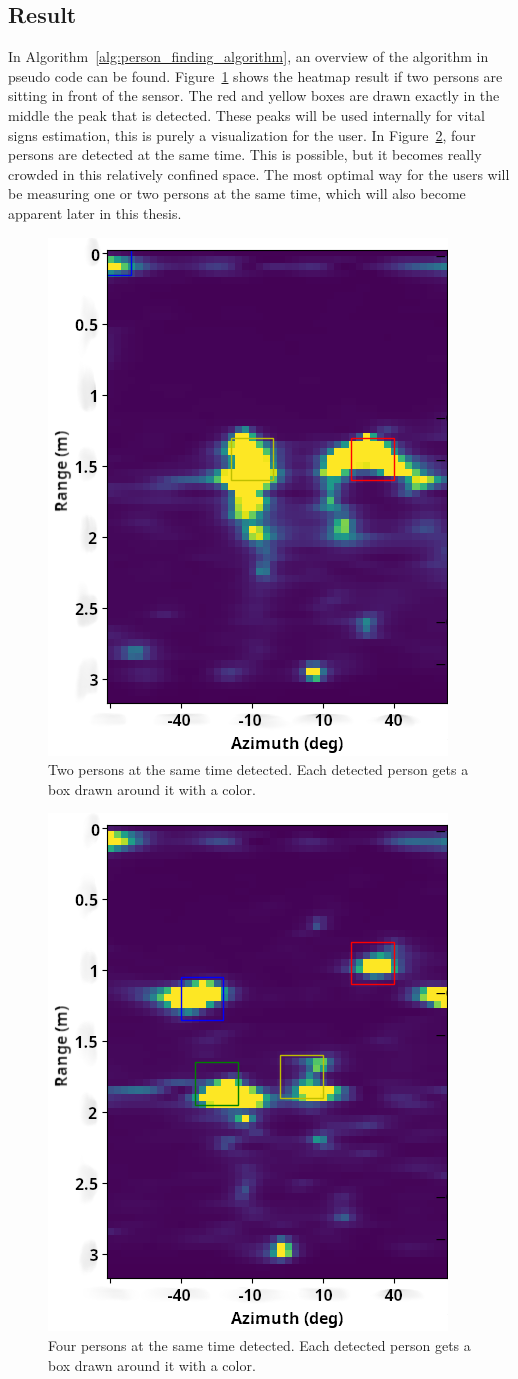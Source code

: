 \subsection{Result}
In Algorithm~\ref{alg:person_finding_algorithm}, an overview of the algorithm in pseudo code can be found. Figure~\ref{fig:person_detection_two} shows the heatmap result if two persons are sitting in front of the sensor. The red and yellow boxes are drawn exactly in the middle the peak that is detected. These peaks will be used internally for vital signs estimation, this is purely a visualization for the user. In Figure~\ref{fig:person_detection_four}, four persons are detected at the same time. This is possible, but it becomes really crowded in this relatively confined space. The most optimal way for the users will be measuring one or two persons at the same time, which will also become apparent later in this thesis. 


\begin{figure}[t]
\centering
\includegraphics[width=.5\textwidth]{figures/people_detection/multiple_3_crop_axes.png}
\caption{Two persons at the same time detected. Each detected person gets a box drawn around it with a color.}
\label{fig:person_detection_two}
\end{figure}

\begin{figure}[t]
\centering
\includegraphics[width=.5\textwidth]{figures/people_detection/4_2_crop_axis.png}
\caption{Four persons at the same time detected. Each detected person gets a box drawn around it with a color.}
\label{fig:person_detection_four}
\end{figure}